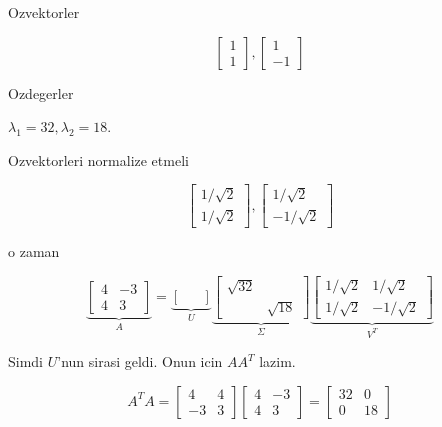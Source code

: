 \documentclass[12pt,fleqn]{article}\usepackage{../common}
\begin{document}
Ozvektorler

\[ 
\left[\begin{array}{r}
1 \\ 1
\end{array}\right],
\left[\begin{array}{r}
1 \\ -1
\end{array}\right]
 \]

Ozdegerler

$\lambda_1=32, \lambda_2=18$. 

Ozvektorleri normalize etmeli

\[ 
\left[\begin{array}{r}
1 / \sqrt{ 2} \\ 1/ \sqrt{ 2}
\end{array}\right],
\left[\begin{array}{r}
1/ \sqrt{ 2} \\ -1/ \sqrt{ 2}
\end{array}\right]
 \]

o zaman 

\[ 
\underbrace{
\left[\begin{array}{rr}
4 & -3 \\ 4 & 3
\end{array}\right] 
}_{A}
=
\underbrace{
\left[\begin{array}{rr}
 &  \\  & 
\end{array}\right]
}_{U}
\underbrace{
\left[\begin{array}{rr}
\sqrt{ 32} &  \\  & \sqrt{ 18}
\end{array}\right]
}_{\Sigma}
\underbrace{
\left[\begin{array}{rr}
1/\sqrt{ 2} & 1/\sqrt{ 2} \\ 1/\sqrt{ 2} & -1/\sqrt{ 2}
\end{array}\right]
}_{V^T}
 \]

Simdi $U$'nun sirasi geldi. Onun icin $AA^T$ lazim. 

\[ A^TA = 
\left[\begin{array}{rr}
4 & 4 \\ -3 & 3
\end{array}\right] 
\left[\begin{array}{rr}
4 & -3 \\ 4 & 3
\end{array}\right] =
\left[\begin{array}{rr}
32 & 0 \\ 0 & 18
\end{array}\right]
 \]
\end{document}
